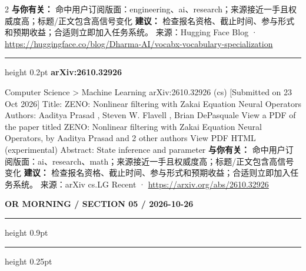 \documentclass[10.5pt]{ctexart}
\begin{document}
\begin{multicols}{2}
\textbf{与你有关：} 命中用户订阅版面：engineering、ai、research；来源接近一手且权威度高；标题/正文包含高信号变化
\textbf{建议：} 检查报名资格、截止时间、参与形式和预期收益；合适则立即加入任务系统。
{\footnotesize\color{ormuted} 来源：Hugging Face Blog · \url{https://huggingface.co/blog/Dharma-AI/vocabx-vocabulary-specialization}}
\vspace{2mm}
\hrule height 0.2pt
\vspace{2mm}
{\large\bfseries arXiv:2610.32926}\par
Computer Science > Machine Learning arXiv:2610.32926 (cs) [Submitted on 23 Oct 2026] Title: ZENO: Nonlinear filtering with Zakai Equation Neural Operators Authors: Aaditya Prasad , Steven W. Flavell , Brian DePasquale View a PDF of the paper titled ZENO: Nonlinear filtering with Zakai Equation Neural Operators, by Aaditya Prasad and 2 other authors View PDF HTML (experimental) Abstract: State inference and parameter 
\textbf{与你有关：} 命中用户订阅版面：ai、research、math；来源接近一手且权威度高；标题/正文包含高信号变化
\textbf{建议：} 检查报名资格、截止时间、参与形式和预期收益；合适则立即加入任务系统。
{\footnotesize\color{ormuted} 来源：arXiv cs.LG Recent · \url{https://arxiv.org/abs/2610.32926}}
\end{multicols}
\newpage
{\small\bfseries OR MORNING / SECTION 05 / 2026-10-26}
\vspace{2mm}
\hrule height 0.9pt
\vspace{1.5mm}
\hrule height 0.25pt
\vspace{4mm}
\end{document}
